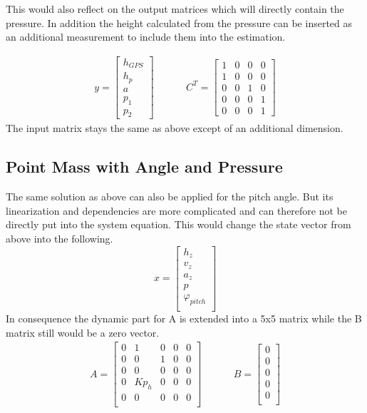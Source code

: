   This would also reflect on the output matrices which will directly contain the pressure.
  In addition the height calculated from the pressure can be inserted as an additional measurement to include them into the estimation.

  \begin{align*}
   y = \begin{bmatrix}
        h_{GPS}	\\
        h_{p}	\\
        a	\\
        p_1	\\
        p_2
       \end{bmatrix}
       & \hspace{1cm}
  C^T = \begin{bmatrix}
       1 & 0 & 0 & 0 \\
       1 & 0 & 0 & 0 \\
       0 & 0 & 1 & 0 \\
       0 & 0 & 0 & 1 \\
       0 & 0 & 0 & 1
      \end{bmatrix}
  \end{align*}
  The input matrix stays the same as above except of an additional dimension.

  \subsection{Point Mass with Angle and Pressure}
  The same solution as above can also be applied for the pitch angle.
  But its linearization and dependencies are more complicated and can therefore not be directly put into the system equation.
  This would change the state vector from above into the following.
  $$ x = \begin{bmatrix}
  h_z\\
  v_z\\
  a_z\\
  p\\
  \varphi_{pitch}\\
  \end{bmatrix} $$
  In consequence the dynamic part for A is extended into a 5x5 matrix while the B matrix still would be a zero vector.
  \begin{align*}
  A= \begin{bmatrix}
        0 & 1 & 0 & 0 & 0 \\
        0 & 0 & 1 & 0 & 0 \\
        0 & 0 & 0 & 0 & 0 \\
        0 & Kp_h & 0 & 0 & 0 \\
        0 & 0 & 0 & 0 & 0 \\
        \end{bmatrix}
  & \hspace{1cm}
  B = \begin{bmatrix}
             0 \\
             0 \\
             0 \\
             0 \\
             0 \\
        \end{bmatrix}
  \end{align*}

